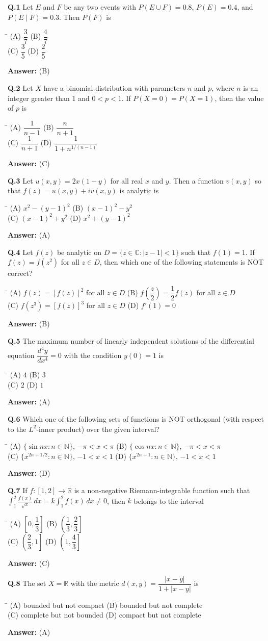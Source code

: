 \documentclass[11pt,a4paper]{article}
\newcommand{\optsfourA}[4]{%
  \begin{tabbing}
    \hspace{0.48\linewidth}\=\kill
    (A) #1 \> (B) #2 \\[2pt]
    (C) #3 \> (D) #4
  \end{tabbing}%
}
\newcommand{\ans}[1]{\textbf{Answer:} #1\par\medskip}
\begin{document}
\textbf{Q.1} Let $E$ and $F$ be any two events with $P(E \cup F) = 0.8$, $P(E) = 0.4$, and $P(E \mid F) = 0.3$. Then $P(F)$ is
\optsfourA{$\dfrac{3}{7}$}{$\dfrac{4}{7}$}{$\dfrac{3}{5}$}{$\dfrac{2}{5}$}
\ans{(B)}

\textbf{Q.2} Let $X$ have a binomial distribution with parameters $n$ and $p$, where $n$ is an integer greater than $1$ and $0 < p < 1$. If $P(X = 0) = P(X = 1)$, then the value of $p$ is
\optsfourA{$\dfrac{1}{n - 1}$}{$\dfrac{n}{n + 1}$}{$\dfrac{1}{n + 1}$}{$\dfrac{1}{1 + n^{1/(n-1)}}$}
\ans{(C)}

\textbf{Q.3} Let $u(x,y) = 2x(1 - y)$ for all real $x$ and $y$. Then a function $v(x,y)$ so that $f(z) = u(x,y) + i v(x,y)$ is analytic is
\optsfourA{$x^2 - (y - 1)^2$}{$(x - 1)^2 - y^2$}{$(x - 1)^2 + y^2$}{$x^2 + (y - 1)^2$}
\ans{(A)}

\textbf{Q.4} Let $f(z)$ be analytic on $D = \{z \in \mathbb{C} : |z - 1| < 1\}$ such that $f(1) = 1$. If $f(z) = f(z^2)$ for all $z \in D$, then which one of the following statements is NOT correct?
\optsfourA{$f(z) = [f(z)]^2$ for all $z \in D$}{$f\!\left(\dfrac{z}{2}\right) = \dfrac{1}{2}f(z)$ for all $z \in D$}{$f(z^3) = [f(z)]^3$ for all $z \in D$}{$f'(1) = 0$}
\ans{(B)}

\textbf{Q.5} The maximum number of linearly independent solutions of the differential equation $\dfrac{d^4 y}{dx^4} = 0$ with the condition $y(0) = 1$ is
\optsfourA{$4$}{$3$}{$2$}{$1$}
\ans{(A)}

\textbf{Q.6} Which one of the following sets of functions is NOT orthogonal (with respect to the $L^2$-inner product) over the given interval?
\optsfourA{$\{\sin nx : n \in \mathbb{N}\}$, $-\pi < x < \pi$}{$\{\cos nx : n \in \mathbb{N}\}$, $-\pi < x < \pi$}{$\{x^{2n+1/2} : n \in \mathbb{N}\}$, $-1 < x < 1$}{$\{x^{2n+1} : n \in \mathbb{N}\}$, $-1 < x < 1$}
\ans{(D)}

\textbf{Q.7} If $f : [1, 2] \to \mathbb{R}$ is a non-negative Riemann-integrable function such that $\displaystyle\int_1^2 \frac{f(x)}{\sqrt{x}}\,dx = k\int_1^2 f(x)\,dx \ne 0$, then $k$ belongs to the interval
\optsfourA{$\left[0, \dfrac{1}{3}\right]$}{$\left(\dfrac{1}{3}, \dfrac{2}{3}\right]$}{$\left(\dfrac{2}{3}, 1\right]$}{$\left(1, \dfrac{4}{3}\right]$}
\ans{(C)}

\textbf{Q.8} The set $X = \mathbb{R}$ with the metric $d(x, y) = \dfrac{|x - y|}{1 + |x - y|}$ is
\optsfourA{bounded but not compact}{bounded but not complete}{complete but not bounded}{compact but not complete}
\ans{(A)}
\end{document}
